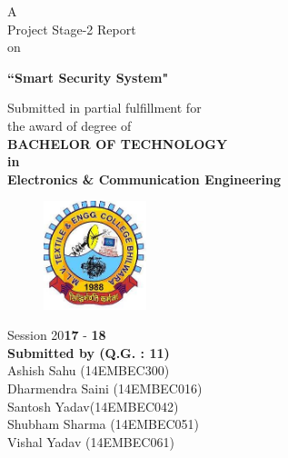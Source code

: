 \documentclass[twoside,a4paper,16pt]{book}
\begin{document}
	
	
	
	\frontmatter
	\thispagestyle{empty}
	
	
	
	
	\begin{center}
		{\Large A \\ Project Stage-2 Report\\ on \\
			\vspace{0.5cm}
			
			{\bf ``Smart Security System"}}
	\end{center}
	
	\vspace{0.3cm}
	\begin{center}
		\Large Submitted in partial fulfillment for \\\vspace{0.5cm} the award of degree of\\\vspace{0.5cm}
		{\bf  BACHELOR OF TECHNOLOGY\\\vspace{0.5cm}in\\\vspace{0.5cm}Electronics \& Communication Engineering}
	\end{center}
	\vspace{0.6cm}
	
	\begin{figure}[ht!]
		\begin{center}
			\includegraphics[width=3.0cm]{logo.jpg}
		\end{center}
	\end{figure}
	
	\vspace{0.2cm}
	
	\begin{center}
		\large Session 20{\bf17} - {\bf18}\\\vspace{0.5cm}
		{\bf Submitted by (Q.G. : 11)}\\
		{\large	\hspace{-0.1cm}Ashish Sahu (14EMBEC300)\\\hspace{0.8cm}
			Dharmendra Saini (14EMBEC016)\\\hspace{0.2cm}Santosh Yadav(14EMBEC042)\\\hspace{0.9cm}Shubham Sharma (14EMBEC051)\\\hspace{0.1cm}Vishal Yadav (14EMBEC061)}
	\end{center}
	
\end{document}
